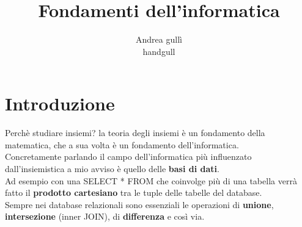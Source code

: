 \documentclass[oneside,12pt]{book}
\title{Fondamenti dell'informatica}
\author{Andrea gullì \\ handgull}
\begin{document}
\maketitle

\tableofcontents

\chapter*{Introduzione}

Perchè studiare insiemi? la teoria degli insiemi è un fondamento della matematica,
che a sua volta è un fondamento dell'informatica. \\
Concretamente parlando il campo dell'informatica più influenzato dall'insiemistica
a mio avviso è quello delle \textbf{basi di dati}. \\
Ad esempio con una SELECT * FROM che coinvolge più di una tabella verrà fatto il \textbf{prodotto cartesiano} tra le tuple delle tabelle del database. \\
Sempre nei database relazionali sono essenziali le operazioni di \textbf{unione}, \textbf{intersezione} (inner JOIN), di \textbf{differenza} e così via.


\end{document}
